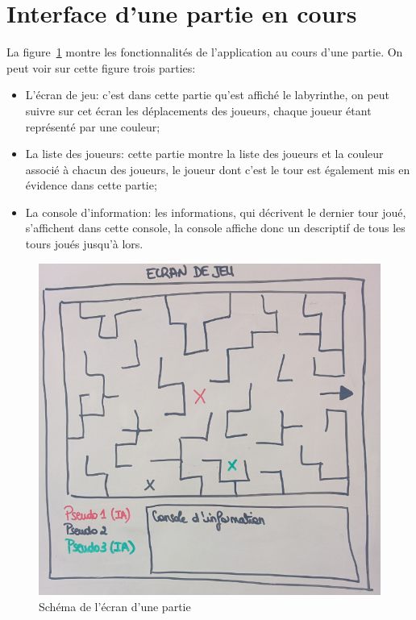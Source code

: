 \section{Interface d'une partie en cours}
	La figure~\ref{fig:ecran_partie} montre les fonctionnalités de l'application au cours d'une partie. On peut voir sur cette figure trois parties:
	\begin{itemize}
		\item L'écran de jeu: c'est dans cette partie qu'est affiché le labyrinthe, on peut suivre sur cet écran les déplacements des joueurs, chaque joueur étant représenté par une couleur;
		\item La liste des joueurs: cette partie montre la liste des joueurs et la couleur associé à chacun des joueurs, le joueur dont c'est le tour est également mis en évidence dans cette partie;
		\color{red}
		\item La console d'information: les informations, qui décrivent le dernier tour joué, s'affichent dans cette console, la console affiche donc un descriptif de tous les tours joués jusqu'à lors.
		\color{black}
	\end{itemize}
	\begin{figure}[h]
		\centering
		\includegraphics[width=15cm]{images/schema_ecran_partie.jpg}
		\caption{Schéma de l'écran d'une partie}
		\label{fig:ecran_partie}
	\end{figure}

